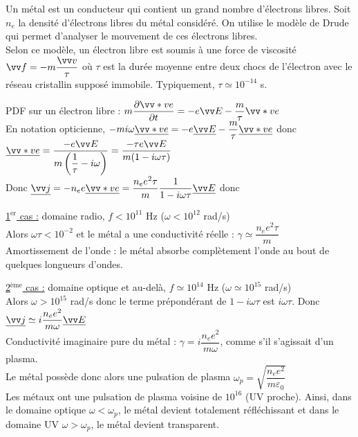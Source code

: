 ﻿\documentclass[a4paper]{article}
\begin{document}
\pagestyle{fancy}
\fancyhf{}
\setlength{\headheight}{15pt}

\begin{center}
	\large{}
\end{center}


Un métal est un conducteur qui contient un grand nombre d'électrons libres. Soit $n_e$ la densité d'électrons libres du métal considéré. On utilise le modèle de Drude qui permet d'analyser le mouvement de ces électrons libres.\\
Selon ce modèle, un électron libre est soumis à une force de viscosité $\vv f=-m \dfrac{\vv v}{\tau}$ où $\tau$ est la durée moyenne entre deux chocs de l'électron avec le réseau cristallin supposé immobile. Typiquement, $\tau\simeq 10^{-14}$ s.\par
PDF sur un électron libre : $m\dfrac{\partial \vv*ve}{\partial t}=-e\vv E- \dfrac{m}{\tau}\vv*ve$\\
En notation opticienne, $-mi\omega \underline{\vv*ve}=-e \underline{\vv E}- \dfrac{m}{\tau}\underline{\vv*ve}$ donc $\underline{\vv*ve}=\dfrac{-e\vv E}{m \left( \dfrac{1}{\tau}-i\omega \right)}=\dfrac{-\tau e\vv E}{m(1-i\omega\tau)}$\\
Donc $\underline{\vv j}=-n_ee \underline{\vv*ve}=\dfrac{n_ee^2\tau}{m}\dfrac{1}{1-i\omega\tau}\underline{\vv E}$ donc
\begin{center}
\end{center}

\underline{1$^{\mathrm{er}}$ cas :} domaine radio, $f<10^{11}$ Hz ($\omega<10^{12}$ rad/s)\\
Alors $\omega\tau<10^{-2}$ et le métal a une conductivité réelle : $\gamma\simeq\dfrac{n_ee^2\tau}{m}$\\
Amortissement de l'onde : le métal absorbe complètement l'onde au bout de quelques longueurs d'ondes.

\underline{2$^{\mathrm{ème}}$ cas :} domaine optique et au-delà, $f\simeq 10^{14}$ Hz ($\omega\simeq 10^{15}$ rad/s)\\
Alors $\omega>10^{15}$ rad/s donc le terme prépondérant de $1-i\omega\tau$ est $i\omega\tau$. Donc $\underline{\vv j}\simeq i \dfrac{n_ee^2}{m\omega}\underline{\vv E}$\\
Conductivité imaginaire pure du métal : $\gamma=i \dfrac{n_ee^2}{m\omega}$, comme s'il s'agissait d'un plasma.\\
Le métal possède donc alors une pulsation de plasma $\omega_p=\sqrt{\dfrac{n_ee^2}{m\varepsilon_0}}$\\
Les métaux ont une pulsation de plasma voisine de $10^{16}$ (UV proche). Ainsi, dans le domaine optique $\omega<\omega_p$, le métal devient totalement réfléchissant et dans le domaine UV $\omega>\omega_p$, le métal devient transparent.
\end{document}
